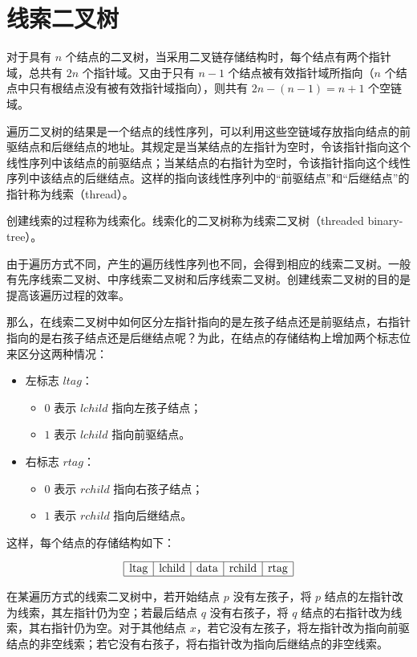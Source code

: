 \documentclass[lang=cn,newtx,10pt,scheme=chinese]{../elegantbook}
\begin{document}
\section{线索二叉树}

对于具有 $n$ 个结点的二叉树，当采用二叉链存储结构时，每个结点有两个指针域，总共有 $2n$ 个指针域。又由于只有 $n-1$ 个结点被有效指针域所指向（$n$ 个结点中只有根结点没有被有效指针域指向），则共有 $2n - (n-1) = n+1$ 个空链域。

遍历二叉树的结果是一个结点的线性序列，可以利用这些空链域存放指向结点的前驱结点和后继结点的地址。其规定是当某结点的左指针为空时，令该指针指向这个线性序列中该结点的前驱结点；当某结点的右指针为空时，令该指针指向这个线性序列中该结点的后继结点。这样的指向该线性序列中的“前驱结点”和“后继结点”的指针称为线索（thread）。

创建线索的过程称为线索化。线索化的二叉树称为线索二叉树（threaded binary-tree）。

由于遍历方式不同，产生的遍历线性序列也不同，会得到相应的线索二叉树。一般有先序线索二叉树、中序线索二叉树和后序线索二叉树。创建线索二叉树的目的是提高该遍历过程的效率。

那么，在线索二叉树中如何区分左指针指向的是左孩子结点还是前驱结点，右指针指向的是右孩子结点还是后继结点呢？为此，在结点的存储结构上增加两个标志位来区分这两种情况：

\begin{itemize}
  \item 左标志 $ltag$：
  \begin{itemize}
    \item $0$ 表示 $lchild$ 指向左孩子结点；
    \item $1$ 表示 $lchild$ 指向前驱结点。
  \end{itemize}
  \item 右标志 $rtag$：
  \begin{itemize}
    \item $0$ 表示 $rchild$ 指向右孩子结点；
    \item $1$ 表示 $rchild$ 指向后继结点。
  \end{itemize}
\end{itemize}

这样，每个结点的存储结构如下：

\[
\begin{array}{|c|c|c|c|c|}
\hline
\text{ltag} & \text{lchild} & \text{data} & \text{rchild} & \text{rtag} \\
\hline
\end{array}
\]

在某遍历方式的线索二叉树中，若开始结点 $p$ 没有左孩子，将 $p$ 结点的左指针改为线索，其左指针仍为空；若最后结点 $q$ 没有右孩子，将 $q$ 结点的右指针改为线索，其右指针仍为空。对于其他结点 $x$，若它没有左孩子，将左指针改为指向前驱结点的非空线索；若它没有右孩子，将右指针改为指向后继结点的非空线索。
\end{document}
